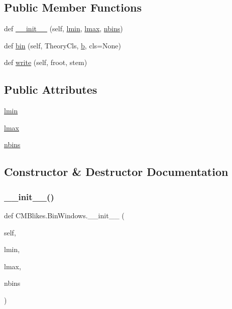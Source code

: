 \subsection*{Public Member Functions}
\begin{DoxyCompactItemize}
\item 
def \mbox{\hyperlink{classCMBlikes_1_1BinWindows_a58ca5ca0d613dd311bc3f75f97673a9f}{\+\_\+\+\_\+init\+\_\+\+\_\+}} (self, \mbox{\hyperlink{classCMBlikes_1_1BinWindows_a57ae8166b156cd6f33470d03d9ff02ae}{lmin}}, \mbox{\hyperlink{classCMBlikes_1_1BinWindows_a28addfcc4371a0b3c4c4ea2c2038161c}{lmax}}, \mbox{\hyperlink{classCMBlikes_1_1BinWindows_a56ffe316738873f14ef5f72563bce153}{nbins}})
\item 
def \mbox{\hyperlink{classCMBlikes_1_1BinWindows_aa6698e02e78f67659793b69ca9325331}{bin}} (self, Theory\+Cls, \mbox{\hyperlink{plotTT_8m_ac0431efac4d7c393d1e70b86115cb93f}{b}}, cls=None)
\item 
def \mbox{\hyperlink{classCMBlikes_1_1BinWindows_a447bc4a1d1f5e848e75a988a381ab81e}{write}} (self, froot, stem)
\end{DoxyCompactItemize}
\subsection*{Public Attributes}
\begin{DoxyCompactItemize}
\item 
\mbox{\hyperlink{classCMBlikes_1_1BinWindows_a57ae8166b156cd6f33470d03d9ff02ae}{lmin}}
\item 
\mbox{\hyperlink{classCMBlikes_1_1BinWindows_a28addfcc4371a0b3c4c4ea2c2038161c}{lmax}}
\item 
\mbox{\hyperlink{classCMBlikes_1_1BinWindows_a56ffe316738873f14ef5f72563bce153}{nbins}}
\end{DoxyCompactItemize}


\subsection{Constructor \& Destructor Documentation}
\mbox{\label{classCMBlikes_1_1BinWindows_a58ca5ca0d613dd311bc3f75f97673a9f}} 
\subsubsection{\texorpdfstring{\+\_\+\+\_\+init\+\_\+\+\_\+()}{\_\_init\_\_()}}
{\footnotesize\ttfamily def C\+M\+Blikes.\+Bin\+Windows.\+\_\+\+\_\+init\+\_\+\+\_\+ (\begin{DoxyParamCaption}\item[{}]{self,  }\item[{}]{lmin,  }\item[{}]{lmax,  }\item[{}]{nbins }\end{DoxyParamCaption})}



